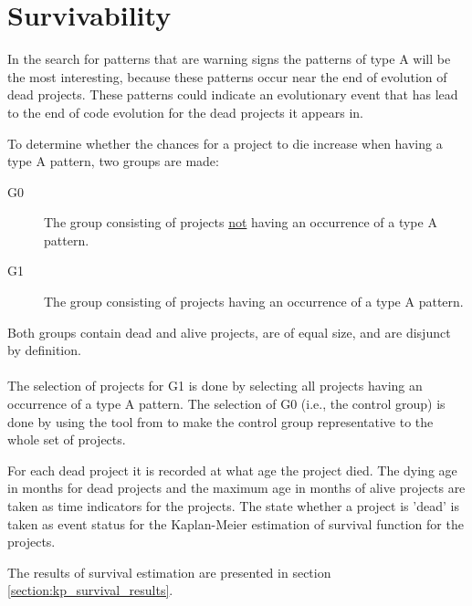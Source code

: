 \section{Survivability}
\label{section:survivability}
In the search for patterns that are warning signs the patterns of type A will
be the most interesting, because these patterns occur near the end of evolution
of dead projects. These patterns could indicate an evolutionary event that has
lead to the end of code evolution for the dead projects it appears in.

To determine whether the chances for a project to die increase when having a
type A pattern, two groups are made:
\begin{description}
	\item[G0] \quad The group consisting of projects \underline{not} having an
		occurrence of a type A pattern.
	\item[G1] \quad The group consisting of projects having an occurrence of a type
		A pattern.
\end{description}

\noindent
Both groups contain dead and alive projects, are of equal size, and are
disjunct by definition.

\paragraph{}
The selection of projects for G1 is done by selecting all projects having an
occurrence of a type A pattern. The selection of G0 (i.e., the control group)
is done by using the tool from \citet{nagappan} to make the control group
representative to the whole set of projects.

For each dead project it is recorded at what age the project died. The dying
age in months for dead projects and the maximum age in months of alive projects
are taken as time indicators for the projects. The state whether a project is
'dead' is taken as event status for the Kaplan-Meier estimation of survival
function for the projects.

The results of survival estimation are presented in section
\ref{section:kp_survival_results}.

\begin{comment}
- Execution of the research
- Phases, steps

This chapter reports on the execution of the research method as described in Chapter 3.

If the research has been divided into phases (e.g., using sub questions) the
phases are introduced, reported on and concluded individually. If needed this
Chapter could be split up to balance out the sizes of all Chapters.
An example Research Chapter is provided as Chapter 3 at Paul’s home
page\footnote{http://homepages.cwi.nl/~paulk/thesesMasterSoftwareEngineering/2006/ReneWiegers.pdf}.
\end{comment}
